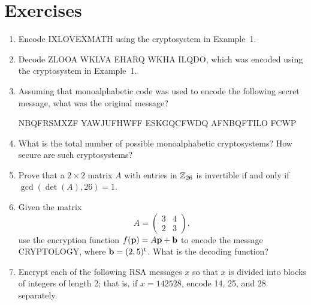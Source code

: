  
 
\section*{Exercises}
\exrule
 
 
{\small 
\begin{enumerate}
 
\bf\item\rm
Encode IXLOVEXMATH using the cryptosystem in Example~1.
 
\bf\item\rm
Decode ZLOOA WKLVA EHARQ WKHA ILQDO, which was encoded using the
cryptosystem in Example~1. 
 
 
\bf\item\rm
Assuming that monoalphabetic code was used to encode the following
secret message, what was the original message?
\begin{center}
NBQFRSMXZF YAWJUFHWFF ESKGQCFWDQ AFNBQFTILO FCWP
\end{center}
 
 
 
\bf\item\rm
What is the total number of possible monoalphabetic cryptosystems? How 
secure are such cryptosystems?
 
 
\bf\item\rm
Prove that a $2 \times 2$ matrix $A$ with entries in ${\Bbb Z}_{26}$
is invertible if and only if $\gcd( \det(A), 26 ) = 1$.
 
 
 
\bf\item\rm
Given the matrix 
$$
A =
\left(
\begin{array}{cc}
3 & 4 \\
2 & 3
\end{array}
\right),
$$
use the encryption function $f({\bold p}) = A {\bold p} + {\bold b}$
to encode the message CRYPTOLOGY, where ${\bold b} = ( 2, 5)^{\rm
t}$.  What is the decoding function?  
 
 
\bf\item\rm
Encrypt each of the following RSA messages $x$ so that $x$ is divided
into blocks of integers of length 2;  that is, if $x = 142528$, encode 
14, 25, and 28 separately.
 
 
\vspace{3pt}        %
 
\hspace{-7pt}
\begin{minipage}[t]{4.6in}
\noindent
\begin{minipage}[t]{2.25in}
\begin{itemize}
 

\end{itemize}
\end{minipage}
\end{minipage}
\end{enumerate}}
